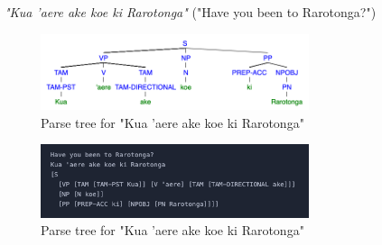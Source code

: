 \begin{enumarabic}
  \item \emph{"Kua 'aere ake koe ki Rarotonga"} ("Have you been to Rarotonga?")

    \begin{figure}[H]
      \centering
      \includegraphics[width=0.7\textwidth]{figures/1.5.png}
      \caption{Parse tree for "Kua 'aere ake koe ki Rarotonga"}
    \end{figure}

    \begin{figure}[H]
      \centering
      \includegraphics[width=0.7\textwidth]{figures/1.5b.png}
      \caption{Parse tree for "Kua 'aere ake koe ki Rarotonga"}
    \end{figure}
    
\end{enumarabic}
